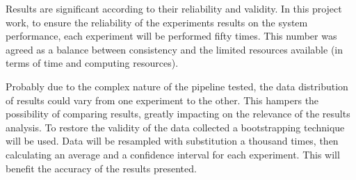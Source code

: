 Results are significant according to their reliability and validity. In this project work, to ensure the reliability of the experiments results on the system performance, each experiment will be performed fifty times. This number was agreed as a balance between consistency and the limited resources available (in terms of time and computing resources).

Probably due to the complex nature of the pipeline tested, the data distribution of results could vary from one experiment to the other. This hampers the possibility of comparing results, greatly impacting on the relevance of the results analysis. To restore the validity of the data collected a bootstrapping technique will be used. Data will be resampled with substitution a thousand times, then calculating an average and a confidence interval for each experiment. This will benefit the accuracy of the results presented.